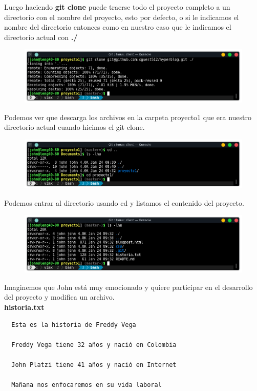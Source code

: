 \documentclass{article}
\begin{document}
\newpage

Luego haciendo \textbf{git clone} puede traerse todo el proyecto completo a un
directorio con el nombre del proyecto, esto por defecto, o si le indicamos el
nombre del directorio entonces como en nuestro caso que le indicamos el
directorio actual con \textbf{./}

\begin{figure}[h!]
  \centering
  \includegraphics[scale=0.75]{./Pictures/260_clone.png}
\end{figure}

Podemos ver que descarga los archivos en la carpeta proyecto1 que era nuestro
directorio actual cuando hicimos el git clone.

\begin{figure}[h!]
  \centering
  \includegraphics[scale=0.75]{./Pictures/261_lslha.png}
\end{figure}

Podemos entrar al directorio usando cd y listamos el contenido del proyecto.

\begin{figure}[h!]
  \centering
  \includegraphics[scale=0.75]{./Pictures/262_lslha.png}
\end{figure}

Imaginemos que John está muy emocionado y quiere participar en el desarrollo
del proyecto y modifica un archivo.\\

\textbf{historia.txt}
\begin{verbatim}
  Esta es la historia de Freddy Vega

  Freddy Vega tiene 32 años y nació en Colombia

  John Platzi tiene 41 años y nació en Internet

  Mañana nos enfocaremos en su vida laboral
\end{verbatim}
\end{document}
